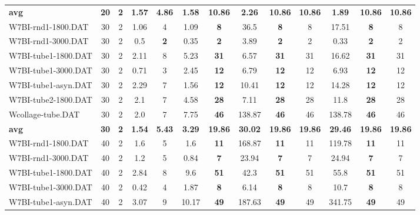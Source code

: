 \begin{table}[h]
{\begin{tabular}{lcccccccccccc}
\cline{1-13} \textbf{avg} & \textbf{20} & \textbf{2} & \textbf{1.57} & \textbf{4.86} & \textbf{1.58} & \textbf{10.86} & \textbf{2.26} & \textbf{10.86} & \textbf{10.86} & \textbf{1.89} & \textbf{10.86} & \textbf{10.86} \\ \cline{1-13}
W7BI-rnd1-1800.DAT & 30 & 2 &  \textcolor{blue2}{1.06} & 4 & 1.09 &  \textbf{8} & 36.5 &  \textbf{8} & 8 & 17.51 &  \textbf{8} & 8 \\
W7BI-rnd1-3000.DAT & 30 & 2 & 0.5 &  \textbf{2} & 0.35 &  \textbf{2} & 3.89 &  \textbf{2} & 2 &  \textcolor{blue2}{0.33} &  \textbf{2} & 2 \\
W7BI-tube1-1800.DAT & 30 & 2 &  \textcolor{blue2}{2.11} & 8 & 5.23 &  \textbf{31} & 6.57 &  \textbf{31} & 31 & 16.62 &  \textbf{31} & 31 \\
W7BI-tube1-3000.DAT & 30 & 2 &  \textcolor{blue2}{0.71} & 3 & 2.45 &  \textbf{12} & 6.79 &  \textbf{12} & 12 & 6.93 &  \textbf{12} & 12 \\
W7BI-tube1-asyn.DAT & 30 & 2 & 2.29 & 7 &  \textcolor{blue2}{1.56} &  \textbf{12} & 10.41 &  \textbf{12} & 12 & 14.28 &  \textbf{12} & 12 \\
W7BI-tube2-1800.DAT & 30 & 2 &  \textcolor{blue2}{2.1} & 7 & 4.58 &  \textbf{28} & 7.11 &  \textbf{28} & 28 & 11.8 &  \textbf{28} & 28 \\
Wcollage-tube.DAT & 30 & 2 &  \textcolor{blue2}{2.0} & 7 & 7.75 &  \textbf{46} & 138.87 &  \textbf{46} & 46 & 138.78 &  \textbf{46} & 46 \\
\cline{1-13} \textbf{avg} & \textbf{30} & \textbf{2} & \textbf{1.54} & \textbf{5.43} & \textbf{3.29} & \textbf{19.86} & \textbf{30.02} & \textbf{19.86} & \textbf{19.86} & \textbf{29.46} & \textbf{19.86} & \textbf{19.86} \\ \cline{1-13}
W7BI-rnd1-1800.DAT & 40 & 2 &  \textcolor{blue2}{1.6} & 5 &  \textcolor{blue2}{1.6} &  \textbf{11} & 168.87 &  \textbf{11} & 11 & 119.78 &  \textbf{11} & 11 \\
W7BI-rnd1-3000.DAT & 40 & 2 & 1.2 & 5 &  \textcolor{blue2}{0.84} &  \textbf{7} & 23.94 &  \textbf{7} & 7 & 24.94 &  \textbf{7} & 7 \\
W7BI-tube1-1800.DAT & 40 & 2 &  \textcolor{blue2}{2.84} & 8 & 9.6 &  \textbf{51} & 42.3 &  \textbf{51} & 51 & 55.8 &  \textbf{51} & 51 \\
W7BI-tube1-3000.DAT & 40 & 2 &  \textcolor{blue2}{0.42} & 4 & 1.87 &  \textbf{8} & 6.14 &  \textbf{8} & 8 & 10.7 &  \textbf{8} & 8 \\
W7BI-tube1-asyn.DAT & 40 & 2 &  \textcolor{blue2}{3.07} & 9 & 10.17 &  \textbf{49} & 187.63 &  \textbf{49} & 49 & 341.75 &  \textbf{49} & 49 \\

\end{tabular}}
\end{table}
